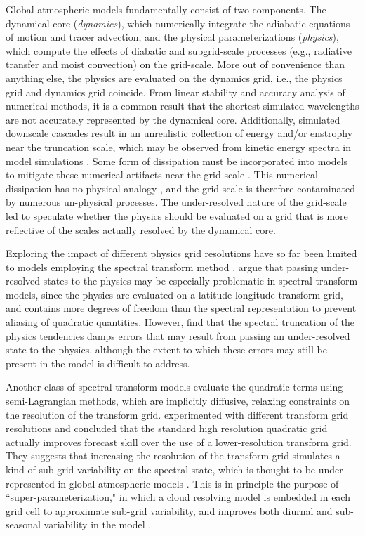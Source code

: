 \documentclass{agujournal}
\begin{document}
Global atmospheric models fundamentally consist of two components. The dynamical core ({\em{dynamics}}), which numerically integrate the adiabatic equations of motion and tracer advection, and the physical parameterizations ({\em{physics}}), which compute the effects of diabatic and subgrid-scale processes (e.g., radiative transfer and moist convection) on the grid-scale. More out of convenience than anything else, the physics are evaluated on the dynamics grid, i.e., the physics grid and dynamics grid coincide. From linear stability and accuracy analysis of numerical methods, it is a common result that the shortest simulated wavelengths are not accurately represented by the dynamical core. Additionally, simulated downscale cascades result in an unrealistic collection of energy and/or enstrophy near the truncation scale, which may be observed from kinetic energy spectra in model simulations \citep{S2011LNCSE}. Some form of dissipation must be incorporated into models to mitigate these numerical artifacts near the grid scale \citep{JW2010LNCSE}. This numerical dissipation has no physical analogy \citep[although see][]{GMR2007}, and the grid-scale is therefore contaminated by numerous un-physical processes. The under-resolved nature of the grid-scale led \cite{LH1997MWR} to speculate whether the physics should be evaluated on a grid that is more reflective of the scales actually resolved by the dynamical core.

Exploring the impact of different physics grid resolutions have so far been limited to models employing the spectral transform method \citep{LH1997MWR,W1999T,W2014PTRSL}. \cite{LH1997MWR} argue that passing under-resolved states to the physics may be especially problematic in spectral transform models, since the physics are evaluated on a latitude-longitude transform grid, and contains more degrees of freedom than the spectral representation to prevent aliasing of quadratic quantities. However, \cite{LH1997MWR} find that the spectral truncation of the physics tendencies damps errors that may result from passing an under-resolved state to the physics, although the extent to which these errors may still be present in the model is difficult to address. 

Another class of spectral-transform models evaluate the quadratic terms using semi-Lagrangian methods, which are implicitly diffusive, relaxing constraints on the resolution of the transform grid. \cite{W2014PTRSL} experimented with different transform grid resolutions and concluded that the standard high resolution quadratic grid actually improves forecast skill over the use of a lower-resolution transform grid. They suggests that increasing the resolution of the transform grid simulates a kind of sub-grid variability on the spectral state, which is thought to be under-represented in global atmospheric models \citep{S2005QJR}. This is in principle the purpose of ``super-parameterization," in which a cloud resolving model is embedded in each grid cell to approximate sub-grid variability, and improves both diurnal and sub-seasonal variability in the model \citep{RKAG2003BAMS}.
\end{document}
